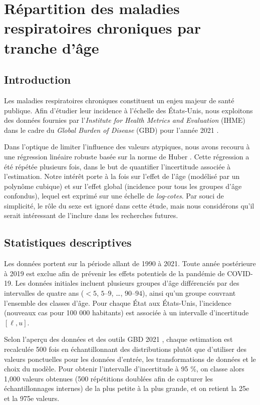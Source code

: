 \chapter{Répartition des maladies respiratoires chroniques par tranche d'âge}

\section{Introduction}
Les maladies respiratoires chroniques constituent un enjeu majeur de santé publique. Afin d'étudier leur incidence à l'échelle des États-Unis, nous exploitons des données fournies par l'\emph{Institute for Health Metrics and Evaluation} (IHME) dans le cadre du \textit{Global Burden of Disease} (GBD) pour l'année 2021 \citep{ihme2024gbd2021}.

Dans l'optique de limiter l'influence des valeurs atypiques, nous avons recouru à une régression linéaire robuste basée sur la norme de Huber \citep{andersen2008modern, rousseeuw2019robust, hampel1986influence, rousseeuw1987robust, maronna2006robust, hubert2008high}. Cette régression a été répétée plusieurs fois, dans le but de quantifier l'incertitude associée à l'estimation. Notre intérêt porte à la fois sur l'effet de l'âge (modélisé par un polynôme cubique) et sur l'effet global (incidence pour tous les groupes d'âge confondus), lequel est exprimé sur une échelle de \emph{log-cotes}. Par souci de simplicité, le rôle du sexe est ignoré dans cette étude, mais nous considérons qu’il serait intéressant de l'inclure dans les recherches futures.

\section{Statistiques descriptives}
Les données portent sur la période allant de 1990 à 2021. Toute année postérieure à 2019 est exclue afin de prévenir les effets potentiels de la pandémie de COVID-19. Les données initiales incluent plusieurs groupes d'âge différenciés par des intervalles de quatre ans ($<5$, $5$–$9$, \dots, $90$–$94$), ainsi qu’un groupe couvrant l'ensemble des classes d'âge. Pour chaque État aux États-Unis, l'incidence (nouveaux cas pour 100 000 habitants) est associée à un intervalle d'incertitude \([\ell, u]\).

Selon l'aperçu des données et des outils GBD 2021 \citep{IHME2024Overview}, chaque estimation est recalculée 500 fois en échantillonnant des distributions plutôt que d'utiliser des valeurs ponctuelles pour les données d'entrée, les transformations de données et le choix du modèle. Pour obtenir l'intervalle d'incertitude à 95 \%, on classe alors 1,000 valeurs obtenues (500 répétitions doublées afin de capturer les échantillonnages internes) de la plus petite à la plus grande, et on retient la 25e et la 975e valeurs.



